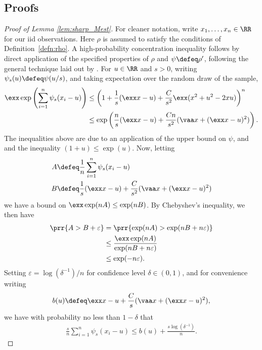 \documentclass[11pt,oneside]{article}
\theoremstyle{definition} \newtheorem{defn}{Definition}       %
\theoremstyle{plain} \newtheorem{prop}[defn]{Proposition}           %
\theoremstyle{plain} \newtheorem{thm}[defn]{Theorem}                %
\theoremstyle{plain} \newtheorem{lem}[defn]{Lemma}                  %
\theoremstyle{plain} \newtheorem{cor}[defn]{Corollary}              %
\theoremstyle{remark} \newtheorem{rmk}[defn]{Remark}                %
\theoremstyle{remark} \newtheorem{ex}[defn]{Example}                %
\begin{document}
\subsection{Proofs}\label{sec:appendix_proofs}

\begin{proof}[Proof of Lemma \ref{lem:sharp_Mest}]
For cleaner notation, write $x_{1},\ldots,x_{n} \in \RR$ for our iid observations. Here $\rho$ is assumed to satisfy the conditions of Definition~\ref{defn:rho}. A high-probability concentration inequality follows by direct application of the specified properties of $\rho$ and $\psi \defeq \rho^{\prime}$, following the general technique laid out by \citet{catoni2009a,catoni2012a}. For $u \in \RR$ and $s>0$, writing $\psi_{s}(u) \defeq \psi(u/s)$, and taking expectation over the random draw of the sample,
%
\begin{align*}
\exx\exp\left( \sum_{i=1}^{n}\psi_{s}(x_{i}-u)\right) & \leq \left(1 + \frac{1}{s}(\exx x-u) + \frac{C}{s^{2}}\exx (x^{2}+u^{2}-2xu) \right)^{n}\\
& \leq \exp\left( \frac{n}{s}(\exx x-u) + \frac{Cn}{s^{2}}(\vaa x + (\exx x - u)^{2}) \right).
\end{align*}
%
The inequalities above are due to an application of the upper bound on $\psi$, and and the inequality $(1+u) \leq \exp(u)$. Now, letting
%
\begin{align*}
A & \defeq \frac{1}{n}\sum_{i=1}^{n}\psi_{s}(x_{i}-u)\\
B & \defeq \frac{1}{s}(\exx x-u) + \frac{C}{s^{2}}(\vaa x + (\exx x - u)^{2})
\end{align*}
we have a bound on $\exx\exp(nA) \leq \exp(nB)$. By Chebyshev's inequality, we then have
%
\begin{align*}
\prr\{A > B + \varepsilon\} & = \prr\{\exp(nA) > \exp(nB+n\varepsilon)\}\\
& \leq \frac{\exx\exp(nA)}{\exp(nB+n\varepsilon)}\\
& \leq \exp(-n\varepsilon).
\end{align*}
%
Setting $\varepsilon=\log(\delta^{-1})/n$ for confidence level $\delta \in (0,1)$, and for convenience writing
%
\begin{align*}
b(u) \defeq \exx x - u + \frac{C}{s}(\vaa x + (\exx x-u)^{2}),
\end{align*}
%
we have with probability no less than $1-\delta$ that
%
\begin{align}\label{eqn:sharp_Mest_1}
\frac{s}{n}\sum_{i=1}^{n} \psi_{s}(x_{i}-u) \leq b(u) + \frac{s\log(\delta^{-1})}{n}.

\end{align}
\end{proof}
\end{document}
